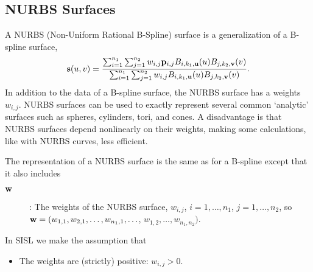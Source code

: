 \subsection{NURBS Surfaces}

A NURBS (Non-Uniform Rational B-Spline) surface is a generalization
of a B-spline surface,
$$ {\bf s}(u,v) = {\sum_{i=1}^{n_1}\sum_{j=1}^{n_2} w_{i,j} {\bf p}_{i,j} 
	    B_{i,k_1,{\bf u}}(u) B_{j,k_2,{\bf v}}(v)  \over
             \sum_{i=1}^{n_1}\sum_{j=1}^{n_2} w_{i,j}
	         B_{i,k_1,{\bf u}}(u) B_{j,k_2,{\bf v}}(v)}. $$
In addition to the data of a B-spline surface, the NURBS surface
has a weights $w_{i,j}$.
NURBS surfaces can be used to exactly represent several common
`analytic' surfaces such as spheres, cylinders, tori, and cones.
A disadvantage is that NURBS surfaces depend nonlinearly on their weights,
making some calculations, like with NURBS curves,
less efficient.

The representation of a NURBS surface is the same as for a B-spline
except that it also includes
\begin{description}
\item[${\bf w}$]: The weights of the NURBS surface,
           $w_{i,j}$, $i=1,\ldots,n_1$, $j=1,\ldots,n_2$, so
          ${\bf w} = (w_{1,1},w_{2,1},\ldots,w_{n_1,1},\ldots$,
                  $w_{1,2},\ldots,w_{n_1,n_2})$.
\end{description}
In SISL we make the assumption that
\begin{itemize}
\item The weights are (strictly) positive: $w_{i,j} > 0$.
\end{itemize}

